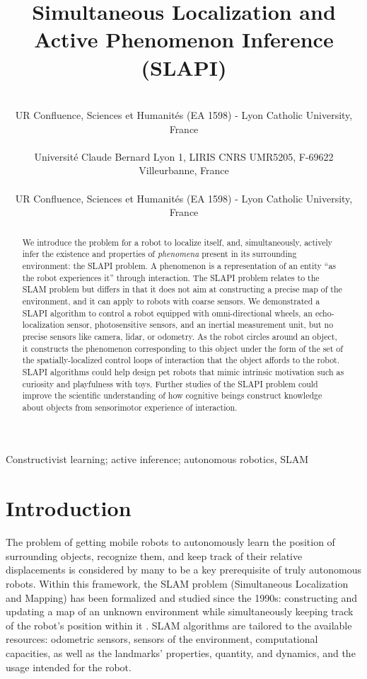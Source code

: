 \documentclass[pmlr]{jmlr}%
\title[SLAPI]{Simultaneous Localization and Active Phenomenon Inference (SLAPI)}
\author{\Name{Olivier L. Georgeon} \Email{ogeorgeon@univ-catholyon.fr}\\
  \addr UR Confluence, Sciences et Humanités (EA 1598) - Lyon Catholic University, France\\
  \Name{Titouan Knockaert} \Email{titouan.knockaert@gmail.com}\\
  \addr Université Claude Bernard Lyon 1, LIRIS CNRS UMR5205, F-69622 Villeurbanne, France\\
  \Name{Juan R. Vidal} \Email{jvidal@univ-catholyon.fr}\\
  \addr UR Confluence, Sciences et Humanités (EA 1598) - Lyon Catholic University, France
}
\begin{document}
\maketitle

\begin{abstract}
We introduce the problem for a robot to  localize itself, and, simultaneously, actively infer the existence and properties of \textit{phenomena} present in its surrounding environment: the SLAPI problem. 
A phenomenon is a representation of an entity ``as the robot experiences it'' through interaction. 
The SLAPI problem relates to the SLAM problem but differs in that it does not aim at constructing a precise map of the environment, and it can apply to robots with coarse sensors. 
We demonstrated a SLAPI algorithm to control a robot equipped with omni-directional wheels, an echo-localization sensor, photosensitive sensors, and an inertial measurement unit, but no precise sensors like camera, lidar, or odometry. 
As the robot circles around an object, it constructs the phenomenon corresponding to this object under the form of the set of the spatially-localized control loops of interaction that the object affords to the robot. 
SLAPI algorithms could help design pet robots that mimic intrinsic motivation such as curiosity and playfulness with toys. 
Further studies of the SLAPI problem could improve the scientific understanding of how cognitive beings construct knowledge about objects from sensorimotor experience of interaction.
\end{abstract}

\begin{keywords}
Constructivist learning; active inference; autonomous robotics, SLAM
\end{keywords}

\section{Introduction}
\label{sec:intro}

The problem of getting mobile robots to autonomously learn the position of surrounding objects, recognize them, and keep track of their relative displacements is considered by many to be a key prerequisite of truly autonomous robots. 
Within this framework, the SLAM problem (Simultaneous Localization and Mapping) has been formalized and studied since the 1990s: constructing and updating a map of an unknown environment while simultaneously keeping track of the robot's position within it \citep[e.g.,][]{taketomi_visual_2017}.
SLAM algorithms are tailored to the available resources: odometric sensors, sensors of the environment, computational capacities, as well as the landmarks' properties, quantity, and dynamics, and the usage intended for the robot.
\end{document}

